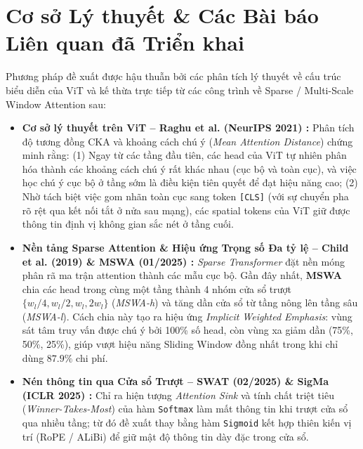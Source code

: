 \documentclass[10pt,a4paper]{article}
\begin{document}
\section{Cơ sở Lý thuyết \& Các Bài báo Liên quan đã Triển khai}

Phương pháp đề xuất được hậu thuẫn bởi các phân tích lý thuyết về cấu trúc biểu diễn của ViT và kế thừa trực tiếp từ các công trình về Sparse / Multi-Scale Window Attention sau:

\begin{itemize}[leftmargin=1.3em, itemsep=1pt, topsep=1pt]
    \item \textbf{Cơ sở lý thuyết trên ViT -- Raghu et al. (NeurIPS 2021) \cite{raghu2021vision}:} Phân tích độ tương đồng CKA và khoảng cách chú ý (\textit{Mean Attention Distance}) chứng minh rằng: (1) Ngay từ các tầng đầu tiên, các head của ViT tự nhiên phân hóa thành các khoảng cách chú ý rất khác nhau (cục bộ và toàn cục), và việc học chú ý cục bộ ở tầng sớm là điều kiện tiên quyết để đạt hiệu năng cao; (2) Nhờ tách biệt việc gom nhãn toàn cục sang token \texttt{[CLS]} (với sự chuyển pha rõ rệt qua kết nối tắt ở nửa sau mạng), các spatial tokens của ViT giữ được thông tin định vị không gian sắc nét ở tầng cuối.
    \item \textbf{Nền tảng Sparse Attention \& Hiệu ứng Trọng số Đa tỷ lệ -- Child et al. (2019) \cite{child2019generating} \& MSWA (01/2025) \cite{xu2025mswa}:} \textit{Sparse Transformer} \cite{child2019generating} đặt nền móng phân rã ma trận attention thành các mẫu cục bộ. Gần đây nhất, \textbf{MSWA} \cite{xu2025mswa} chia các head trong cùng một tầng thành 4 nhóm cửa sổ trượt $\{w_l/4, w_l/2, w_l, 2w_l\}$ (\textit{MSWA-h}) và tăng dần cửa sổ từ tầng nông lên tầng sâu (\textit{MSWA-l}). Cách chia này tạo ra hiệu ứng \textit{Implicit Weighted Emphasis}: vùng sát tâm truy vấn được chú ý bởi 100\% số head, còn vùng xa giảm dần (75\%, 50\%, 25\%), giúp vượt hiệu năng Sliding Window đồng nhất trong khi chỉ dùng $87.9\%$ chi phí.
    \item \textbf{Nén thông tin qua Cửa sổ Trượt -- SWAT (02/2025) \cite{fu2025swat} \& SigMa (ICLR 2025) \cite{ramapuram2025theory}:} Chỉ ra hiện tượng \textit{Attention Sink} và tính chất triệt tiêu (\textit{Winner-Takes-Most}) của hàm \texttt{Softmax} làm mất thông tin khi trượt cửa sổ qua nhiều tầng; từ đó đề xuất thay bằng hàm \texttt{Sigmoid} kết hợp thiên kiến vị trí (RoPE / ALiBi) để giữ mật độ thông tin dày đặc trong cửa sổ.
\end{itemize}
\end{document}
